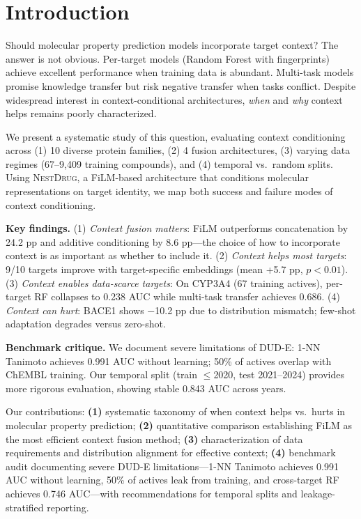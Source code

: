 \documentclass[runningheads]{llncs}
\newcommand{\methodname}{\textsc{NestDrug}}
\begin{document}
\section{Introduction}
\label{sec:intro}

Should molecular property prediction models incorporate target context? The answer is not obvious. Per-target models (Random Forest with fingerprints) achieve excellent performance when training data is abundant. Multi-task models promise knowledge transfer but risk negative transfer when tasks conflict. Despite widespread interest in context-conditional architectures, \textit{when} and \textit{why} context helps remains poorly characterized.

We present a systematic study of this question, evaluating context conditioning across (1) 10 diverse protein families, (2) 4 fusion architectures, (3) varying data regimes (67--9,409 training compounds), and (4) temporal vs.\ random splits. Using \methodname{}, a FiLM-based architecture \cite{perez_2018_film} that conditions molecular representations on target identity, we map both success and failure modes of context conditioning.

\textbf{Key findings.} (1) \textit{Context fusion matters}: FiLM outperforms concatenation by 24.2 pp and additive conditioning by 8.6 pp---the choice of how to incorporate context is as important as whether to include it. (2) \textit{Context helps most targets}: 9/10 targets improve with target-specific embeddings (mean +5.7 pp, $p < 0.01$). (3) \textit{Context enables data-scarce targets}: On CYP3A4 (67 training actives), per-target RF collapses to 0.238 AUC while multi-task transfer achieves 0.686. (4) \textit{Context can hurt}: BACE1 shows $-$10.2 pp due to distribution mismatch; few-shot adaptation degrades versus zero-shot.

\textbf{Benchmark critique.} We document severe limitations of DUD-E: 1-NN Tanimoto achieves 0.991 AUC without learning; 50\% of actives overlap with ChEMBL training. Our temporal split (train $\leq$2020, test 2021--2024) provides more rigorous evaluation, showing stable 0.843 AUC across years.

Our contributions: \textbf{(1)} systematic taxonomy of when context helps vs.\ hurts in molecular property prediction; \textbf{(2)} quantitative comparison establishing FiLM as the most efficient context fusion method; \textbf{(3)} characterization of data requirements and distribution alignment for effective context; \textbf{(4)} benchmark audit documenting severe DUD-E limitations---1-NN Tanimoto achieves 0.991 AUC without learning, 50\% of actives leak from training, and cross-target RF achieves 0.746 AUC---with recommendations for temporal splits and leakage-stratified reporting.
\end{document}
